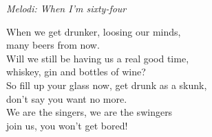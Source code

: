 {\footnotesize\textit{Melodi: When I'm sixty-four}}\par
\vspace{10pt}
When we get drunker, loosing our minds,\\
many beers from now.\\
Will we still be having us a real good time,\\
whiskey, gin and bottles of wine?\\
So fill up your glass now, get drunk as a skunk,\\
don't say you want no more.\\
We are the singers, we are the swingers\\
join us, you won't get bored!
